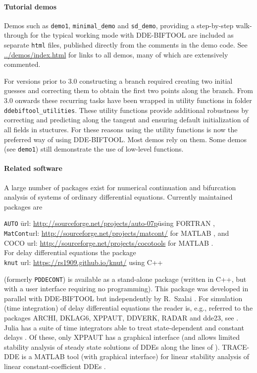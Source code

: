 \documentclass[10pt]{scrartcl}
\newcommand{\DDEBIFCODE}{\textsc{DDE-BIFTOOL}}
\newcommand{\ddebifweb}{\url{https://sourceforge.net/projects/ddebiftool}}
\newcommand{\demobase}{\url{../demos/index.html}}
\begin{document}
\paragraph{Tutorial demos}
Demos such as \texttt{demo1}, \texttt{minimal\_demo} and
\texttt{sd\_demo}, providing a step-by-step walk-through for the
typical working mode with \DDEBIFCODE{} are included as separate
\texttt{html} files, published directly from the comments in the demo
code. See \demobase{} for links to all demos, many of which are
extensively commented.

For versions prior to 3.0 constructing a branch required creating two
initial guesses and correcting them to obtain the first two points
along the branch. From 3.0 onwards these recurring tasks have been
wrapped in utility functions in folder
\texttt{ddebiftool\_utilities}. These utility functions provide
additional robustness by correcting and predicting along the tangent
and ensuring default initialization of all fields in stuctures. For
these reasons using the utility functions is now the preferred way of
using \DDEBIFCODE{}. Most demos rely on them. Some demos (see
\texttt{demo1}) still demonstrate the use of low-level functions.


\paragraph{Related software}
A large number of packages exist for numerical continuation and
bifurcation analysis of systems of ordinary differential
equations. Currently maintained packages are
\begin{tabbing}
  \texttt{AUTO}\qquad
  \= url: \url{http://sourceforge.net/projects/auto-07p}\qquad\=
  using FORTRAN \cite{Doed07,Doed99},\\
  \texttt{MatCont}\>url: \url{http://sourceforge.net/projects/matcont/}\>
  for MATLAB \cite{DGK03,G00}, and\\
  \textsc{COCO}\> url: \url{http://sourceforge.net/projects/cocotools}\> for
  MATLAB \cite{DS13}.\\[1ex]
  For delay differential equations the package\\[0.5ex]
  \texttt{knut}\> url: \url{https://rs1909.github.io/knut/}\> using C++
\end{tabbing}
(formerly \texttt{PDDECONT}) is available as a stand-alone package
(written in C++, but with a user interface requiring no
programming). This package was developed in parallel with
\DDEBIFCODE{} but independently by R.~Szalai \cite{SSH06,RS07}.  For
simulation (time integration) of delay differential equations the
reader is, e.g., referred to the packages ARCHI, DKLAG6, XPPAUT,
DDVERK, RADAR and dde23, see
\cite{Paul95,Thom97,Erme98,Enri97,Sham00,Gugl07}. Julia has a suite of
time integrators able to treat state-dependent and constant delays
\cite{RN17Julia}. Of these, only XPPAUT has a graphical interface (and
allows limited stability analysis of steady state solutions of DDEs
along the lines of \cite{Luzy96}). TRACE-DDE is a MATLAB tool (with
graphical interface) for linear stability analysis of linear
constant-coefficient DDEs
\cite{breda09}.%
\end{document}
